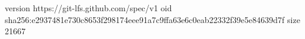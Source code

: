 version https://git-lfs.github.com/spec/v1
oid sha256:e2937481e730c8653f298174eee91a7c9ffa63e6c0eab22332f39e5e84639d7f
size 21667
